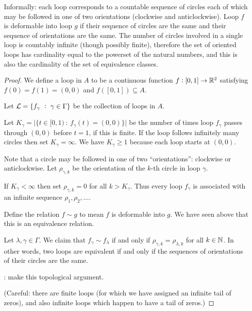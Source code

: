 \begin{enumerate}[label=(\alph*)]
  Informally: each loop corresponds to a countable sequence of circles each of which may be followed in one of
  two orientations (clockwise and anticlockwise). Loop $f$ is deformable into loop $g$ if their sequence of
  circles are the same and their sequence of orientations are the same. The number of circles involved in a
  single loop is countably infinite (though possibly finite), therefore the set of oriented loops has
  cardinality equal to the powerset of the natural numbers, and this is also the cardinality of the set of
  equivalence classes.

  \begin{proof}
    We define a loop in $A$ to be a continuous function $f: [0, 1] \to \mathbb{R}^2$ satisfying $f(0) = f(1) = (0, 0)$
    and $f([0, 1]) \subseteq A$.

    Let $\mathcal L = \{f_\gamma ~:~ \gamma \in \Gamma\}$ be the collection of loops in $A$.

    Let $K_\gamma = \big|\{t \in [0, 1) ~:~ f_\gamma(t) = (0, 0) \}\big|$ be the number of times
    loop $f_\gamma$ passes through $(0, 0)$ before $t = 1$, if this is finite. If the loop follows infinitely
    many circles then set $K_\gamma = \infty$. We have $K_\gamma \geq 1$ because each loop starts
    at $(0, 0)$.

    Note that a circle may be followed in one of two ``orientations​'': clockwise or anticlockwise.
    Let $\rho_{\gamma, k}$ be the orientation of the $k$-th circle in loop $\gamma$.

    If $K_\gamma < \infty$ then set $\rho_{\gamma, k} = 0$ for all $k > K_\gamma$. Thus every loop $f_\gamma$
    is associated with an infinite sequence $\rho_1, \rho_2, \ldots$.

    Define the relation $f \sim g$ to mean $f$ is deformable into $g$. We have seen above that this is an
    equivalence relation.

    Let $\lambda, \gamma \in \Gamma$. We claim that $f_\gamma \sim f_\lambda$ if and only
    if $\rho_{\gamma, k} = \rho_{\lambda, k}$ for all $k \in \mathbb{N}$. In other words, two loops are equivalent if
    and only if the sequences of orientations of their circles are the same.

    : make this topological argument.

    (Careful: there are finite loops (for which we have assigned an infinite tail of zeros), and also infinite
    loops which happen to have a tail of zeros.)


\end{proof}
\end{enumerate}
